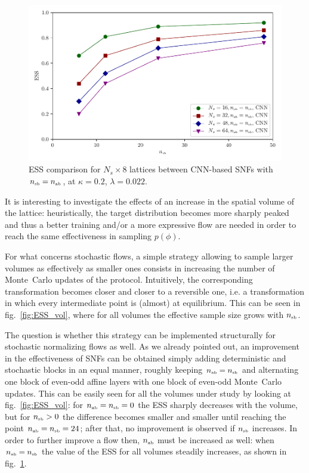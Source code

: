 \documentclass[11pt]{article}
\newcommand{\nab}{n_{\mbox{\tiny{ab}}}}
\newcommand{\nsb}{n_{\mbox{\tiny{sb}}}}
\begin{document}
\begin{figure}[!htb]
\begin{center}
\includegraphics*[width=\textwidth]{ESS_vol_2.pdf}
\caption{ESS comparison for $N_s \times 8$ lattices between CNN-based SNFs with $\nsb=\nab$, at $\kappa=0.2$, $\lambda=0.022$. \label{fig:ESS_vol_2}}
\end{center}
\end{figure}

It is interesting to investigate the effects of an increase in the spatial volume of the lattice: heuristically, the target distribution becomes more sharply peaked and thus a better training and/or a more expressive flow are needed in order to reach the same effectiveness in sampling $p(\phi)$. 


For what concerns stochastic flows, a simple strategy allowing to sample larger volumes as effectively as smaller ones consists in increasing the number of Monte~Carlo updates of the protocol. Intuitively, the corresponding transformation becomes closer and closer to a reversible one, i.e. a transformation in which every intermediate point is (almost) at equilibrium. This can be seen in fig.~\ref{fig:ESS_vol}, where for all volumes the effective sample size grows with $\nsb$.

The question is whether this strategy can be implemented structurally for stochastic normalizing flows as well. As we already pointed out, an improvement in the effectiveness of SNFs can be obtained simply adding deterministic and stochastic blocks in an equal manner, roughly keeping $\nab = \nsb$ and alternating one block of even-odd affine layers with one block of even-odd Monte~Carlo updates. This can be easily seen for all the volumes under study by looking at fig.~\ref{fig:ESS_vol}: for $\nab = \nsb = 0$ the ESS sharply decreases with the volume, but for $\nsb > 0$ the difference becomes smaller and smaller until reaching the point $\nab = \nsb = 24$; after that, no improvement is observed if $\nsb$ increases. In order to further improve a flow then, $\nab$ must be increased as well: when $\nab=\nsb$ the value of the ESS for all volumes steadily increases, as shown in fig.~\ref{fig:ESS_vol_2}.
\end{document}
